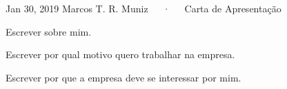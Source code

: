 \documentclass[11pt, a4paper]{awesome-cv}
\begin{document}
\makecvheader[L]

\makecvfooter
  {Jan 30, 2019}
  {Marcos T. R. Muniz~~~·~~~Carta de Apresentação}
  {}

\makelettertitle

\begin{cvletter}

Escrever sobre mim.

Escrever por qual motivo quero trabalhar na empresa.

Escrever por que a empresa deve se interessar por mim.

\end{cvletter}


\makeletterclosing
\end{document}
